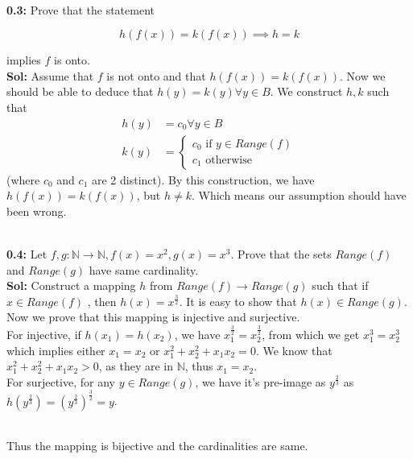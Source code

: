 \documentclass[xcolor=svgnames]{beamer}
\begin{document}
\begin{frame}{}
    \\ \textbf{0.3:} Prove that the statement 
    
    $$h(f(x)) = k(f(x)) \implies h = k$$
    
    implies $f$ is onto.
    \\ \textbf{Sol:} Assume that $f$ is not onto and that $h(f(x)) = k(f(x))$. Now we should be able to deduce that $h(y) = k(y) \forall y \in B$. We construct $h ,k$ such that 
    \begin{align*}
     h(y) &= c_0 \forall y \in B   
     \\ k(y) &= \begin{cases}
            c_0 \text{ if $y \in Range(f)$}
            \\ c_1 \text{ otherwise}
                \end{cases}
    \end{align*}
     (where $c_0$ and $c_1$ are 2 distinct). By this construction, we have $h(f(x)) = k(f(x))$, but $h \neq k$. Which means our assumption should have been wrong.
\end{frame}

\begin{frame}{}
    \\ \textbf{0.4:} Let $f,g:\mathbb{N} \rightarrow \mathbb{N},f(x)=x^2,g(x)=x^3$.  Prove that the sets $Range(f)$ and $Range(g)$ have same cardinality.
    \\ \textbf{Sol:} Construct a mapping $h$ from $Range(f) \rightarrow Range(g)$ such that  if $x \in Range(f)$ , then $h(x) = x^{\frac{3}{2}}$. It is easy to show that $h(x) \in Range(g)$. Now we prove that this mapping is injective and surjective. 
    \\ For injective, if $h(x_1) = h(x_2)$, we have $x_1^{\frac{3}{2}} = x_2^{\frac{3}{2}}$, from which we get $x_1^3 = x_2 ^ 3$ which implies either $x_1 = x_2$ or $x_1^2 + x_2^2 + x_1x_2 = 0$. We know that $x_1^2 + x_2^2 + x_1x_2 > 0$, as they are in $\mathbb{N}$, thus $x_1 = x_2$.
    \\ For surjective, for any $y \in Range(g)$, we have it's pre-image as $y^{\frac{2}{3}}$ as $h(y^{\frac{2}{3}}) = (y^{\frac{2}{3}})^{\frac{3}{2}} = y$. 
    
    \\ Thus the mapping is bijective and the cardinalities are same.
\end{frame}

\end{document}
